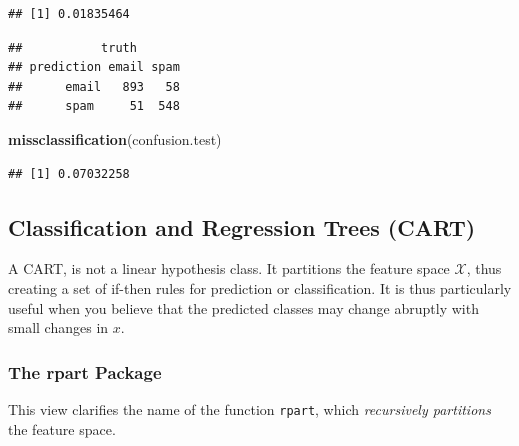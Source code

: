 \documentclass[]{book}
\newenvironment{Shaded}{\begin{snugshade}}{\end{snugshade}}
\newcommand{\KeywordTok}[1]{\textcolor[rgb]{0.13,0.29,0.53}{\textbf{#1}}}
\newcommand{\DataTypeTok}[1]{\textcolor[rgb]{0.13,0.29,0.53}{#1}}
\newcommand{\DecValTok}[1]{\textcolor[rgb]{0.00,0.00,0.81}{#1}}
\newcommand{\StringTok}[1]{\textcolor[rgb]{0.31,0.60,0.02}{#1}}
\newcommand{\CommentTok}[1]{\textcolor[rgb]{0.56,0.35,0.01}{\textit{#1}}}
\newcommand{\OperatorTok}[1]{\textcolor[rgb]{0.81,0.36,0.00}{\textbf{#1}}}
\newcommand{\NormalTok}[1]{#1}
\theoremstyle{definition}
\theoremstyle{definition}
\theoremstyle{definition}
\theoremstyle{remark}
\begin{document}
\begin{verbatim}
## [1] 0.01835464
\end{verbatim}

\begin{Shaded}
\end{Shaded}

\begin{verbatim}
##           truth
## prediction email spam
##      email   893   58
##      spam     51  548
\end{verbatim}

\begin{Shaded}
\begin{Highlighting}[]
\KeywordTok{missclassification}\NormalTok{(confusion.test)}
\end{Highlighting}
\end{Shaded}

\begin{verbatim}
## [1] 0.07032258
\end{verbatim}

\subsection{Classification and Regression Trees
(CART)}\label{classification-and-regression-trees-cart}

A CART, is not a linear hypothesis class. It partitions the feature
space \(\mathcal{X}\), thus creating a set of if-then rules for
prediction or classification. It is thus particularly useful when you
believe that the predicted classes may change abruptly with small
changes in \(x\).

\subsubsection{The rpart Package}\label{the-rpart-package}

This view clarifies the name of the function \texttt{rpart}, which
\emph{recursively partitions} the feature space.
\end{document}
